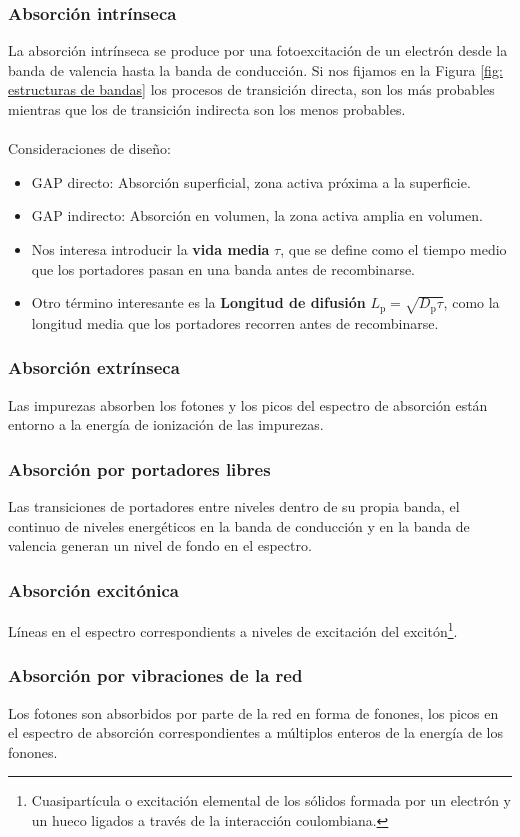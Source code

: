 \subsubsection{Absorción intrínseca}
La absorción intrínseca se produce por una fotoexcitación de un electrón desde la banda de valencia hasta la banda de conducción. Si nos fijamos en la Figura \ref{fig: estructuras de bandas} los procesos de transición directa, son los más probables mientras que los de transición indirecta son los menos probables.\\\\
Consideraciones de diseño:
\begin{itemize}
    \item GAP directo: Absorción superficial, zona activa próxima a la superficie.
    \item GAP indirecto: Absorción en volumen, la zona activa amplia en volumen.
    \item Nos interesa introducir la \textbf{vida media} $\tau$, que se define como el tiempo medio que los portadores pasan en una banda antes de recombinarse.
    \item Otro término interesante es la \textbf{Longitud de difusión} $L_\mathrm{p}=\sqrt{D_\mathrm{p} \tau}$, como la longitud media que los portadores recorren antes de recombinarse.
\end{itemize}
\subsubsection{Absorción extrínseca}
Las impurezas absorben los fotones y los picos del espectro de absorción están entorno a la energía de ionización de las impurezas.
\subsubsection{Absorción por portadores libres}
Las transiciones de portadores entre niveles dentro de su propia banda, el continuo de niveles energéticos en la banda de conducción y en la banda de valencia generan un nivel de fondo en el espectro.
\subsubsection{Absorción excitónica}
Líneas en el espectro correspondients a niveles de excitación del excitón\footnote{Cuasipartícula o excitación elemental de los sólidos formada por un electrón y un hueco ligados a través de la interacción coulombiana.}.
\subsubsection{Absorción por vibraciones de la red}
Los fotones son absorbidos por parte de la red en forma de fonones, los picos en el espectro de absorción correspondientes a múltiplos enteros de la energía de los fonones.
